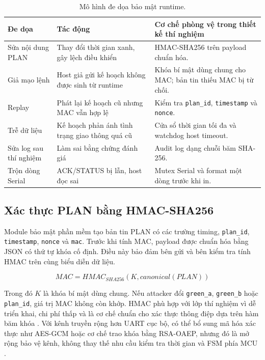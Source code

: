\begin{table}[H]
\centering
\caption{Mô hình đe dọa bảo mật runtime.}
\label{tab:security-threats}
\footnotesize
\setlength{\tabcolsep}{4pt}
\renewcommand{\arraystretch}{1.18}
\begin{tabularx}{\linewidth}{R{2.9cm}R{3.6cm}Y}
\toprule
\textbf{Đe dọa} & \textbf{Tác động} & \textbf{Cơ chế phòng vệ trong thiết kế thí nghiệm} \\
\midrule
Sửa nội dung PLAN & Thay đổi thời gian xanh, gây lệch điều khiển & HMAC-SHA256 trên payload chuẩn hóa. \\
Giả mạo lệnh & Host giả gửi kế hoạch không được sinh từ runtime & Khóa bí mật dùng chung cho MAC; bản tin thiếu MAC bị từ chối. \\
Replay & Phát lại kế hoạch cũ nhưng MAC vẫn hợp lệ & Kiểm tra \texttt{plan\_id}, \texttt{timestamp} và \texttt{nonce}. \\
Trễ dữ liệu & Kế hoạch phản ánh tình trạng giao thông quá cũ & Cửa sổ thời gian tối đa và watchdog host timeout. \\
Sửa log sau thí nghiệm & Làm sai bằng chứng đánh giá & Audit log dạng chuỗi băm SHA-256. \\
Trộn dòng Serial & ACK/STATUS bị lẫn, host đọc sai & Mutex Serial và format một dòng trước khi in. \\
\bottomrule
\end{tabularx}
\normalsize
\end{table}

\subsection{Xác thực PLAN bằng HMAC-SHA256}

Module bảo mật phần mềm tạo bản tin PLAN có các trường timing, \texttt{plan\_id}, \texttt{timestamp}, \texttt{nonce} và \texttt{mac}. Trước khi tính MAC, payload được chuẩn hóa bằng JSON có thứ tự khóa cố định. Điều này bảo đảm bên gửi và bên kiểm tra tính HMAC trên cùng biểu diễn dữ liệu.

\begin{equation}
MAC = HMAC_{SHA256}(K, canonical(PLAN))
\end{equation}

Trong đó \(K\) là khóa bí mật dùng chung. Nếu attacker đổi \texttt{green\_a}, \texttt{green\_b} hoặc \texttt{plan\_id}, giá trị MAC không còn khớp. HMAC phù hợp với lớp thí nghiệm vì dễ triển khai, chi phí thấp và là cơ chế chuẩn cho xác thực thông điệp dựa trên hàm băm khóa \cite{rfc2104_hmac,fips1804_sha256}. Với kênh truyền rộng hơn UART cục bộ, có thể bổ sung mã hóa xác thực như AES-GCM hoặc cơ chế trao khóa bằng RSA-OAEP, nhưng đó là mở rộng bảo vệ kênh, không thay thế nhu cầu kiểm tra thời gian và FSM phía MCU \cite{nist_sp800_38d,rfc8017_pkcs1}.


